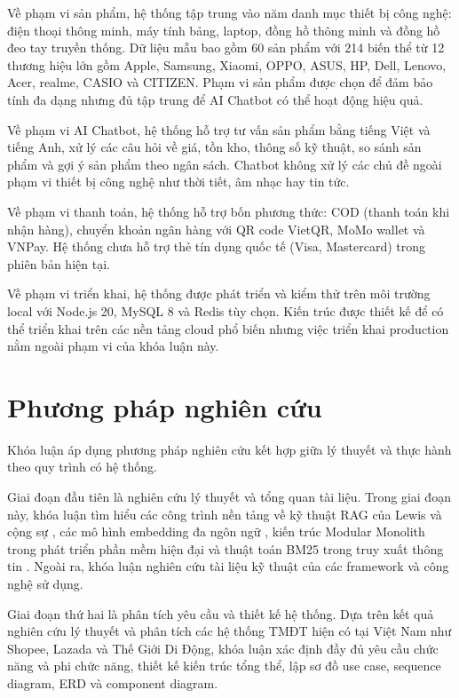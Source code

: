 Về phạm vi sản phẩm, hệ thống tập trung vào năm danh mục thiết bị công nghệ: điện thoại thông minh, máy tính bảng, laptop, đồng hồ thông minh và đồng hồ đeo tay truyền thống. Dữ liệu mẫu bao gồm 60 sản phẩm với 214 biến thể từ 12 thương hiệu lớn gồm Apple, Samsung, Xiaomi, OPPO, ASUS, HP, Dell, Lenovo, Acer, realme, CASIO và CITIZEN. Phạm vi sản phẩm được chọn để đảm bảo tính đa dạng nhưng đủ tập trung để AI Chatbot có thể hoạt động hiệu quả.

Về phạm vi AI Chatbot, hệ thống hỗ trợ tư vấn sản phẩm bằng tiếng Việt và tiếng Anh, xử lý các câu hỏi về giá, tồn kho, thông số kỹ thuật, so sánh sản phẩm và gợi ý sản phẩm theo ngân sách. Chatbot không xử lý các chủ đề ngoài phạm vi thiết bị công nghệ như thời tiết, âm nhạc hay tin tức.

Về phạm vi thanh toán, hệ thống hỗ trợ bốn phương thức: COD (thanh toán khi nhận hàng), chuyển khoản ngân hàng với QR code VietQR, MoMo wallet và VNPay. Hệ thống chưa hỗ trợ thẻ tín dụng quốc tế (Visa, Mastercard) trong phiên bản hiện tại.

Về phạm vi triển khai, hệ thống được phát triển và kiểm thử trên môi trường local với Node.js 20, MySQL 8 và Redis tùy chọn. Kiến trúc được thiết kế để có thể triển khai trên các nền tảng cloud phổ biến nhưng việc triển khai production nằm ngoài phạm vi của khóa luận này.

\section{Phương pháp nghiên cứu}

Khóa luận áp dụng phương pháp nghiên cứu kết hợp giữa lý thuyết và thực hành theo quy trình có hệ thống.

Giai đoạn đầu tiên là nghiên cứu lý thuyết và tổng quan tài liệu. Trong giai đoạn này, khóa luận tìm hiểu các công trình nền tảng về kỹ thuật RAG của Lewis và cộng sự \cite{lewis2020rag}, các mô hình embedding đa ngôn ngữ \cite{devlin2019bert} \cite{jinaai2024}, kiến trúc Modular Monolith trong phát triển phần mềm hiện đại \cite{newman2019monolith} và thuật toán BM25 trong truy xuất thông tin \cite{robertson2009probabilistic}. Ngoài ra, khóa luận nghiên cứu tài liệu kỹ thuật của các framework và công nghệ sử dụng.

Giai đoạn thứ hai là phân tích yêu cầu và thiết kế hệ thống. Dựa trên kết quả nghiên cứu lý thuyết và phân tích các hệ thống TMĐT hiện có tại Việt Nam như Shopee, Lazada và Thế Giới Di Động, khóa luận xác định đầy đủ yêu cầu chức năng và phi chức năng, thiết kế kiến trúc tổng thể, lập sơ đồ use case, sequence diagram, ERD và component diagram.

